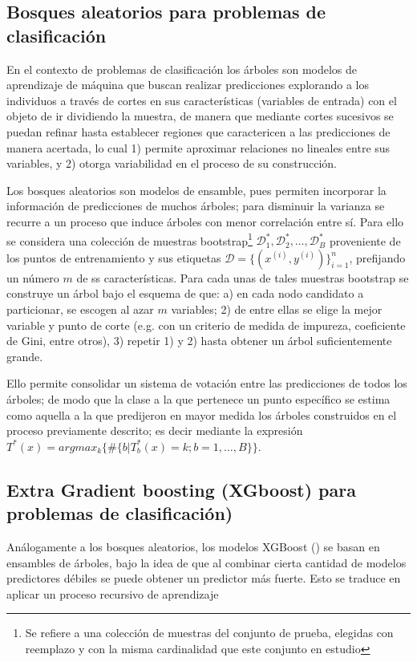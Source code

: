 \documentclass[9pt,twocolumn,twoside]{ilcss}
\begin{document}
\subsection{Bosques aleatorios para problemas de clasificación}

En el contexto de problemas de clasificación los árboles son modelos de aprendizaje de máquina que buscan realizar predicciones explorando a los individuos a través de cortes en sus características (variables de entrada) con el objeto de ir dividiendo la muestra, de manera que mediante cortes sucesivos se puedan refinar hasta establecer regiones que caractericen a las predicciones de manera acertada, lo cual 1) permite aproximar relaciones no lineales entre sus variables, y 2) otorga variabilidad en el proceso de su construcción.

Los bosques aleatorios son modelos de ensamble, pues permiten incorporar la información de predicciones de muchos árboles; para disminuir la varianza se recurre a un proceso que induce árboles con menor correlación entre sí. Para ello se considera una colección de muestras bootstrap\footnote{Se refiere a una colección de muestras del conjunto de prueba, elegidas con reemplazo y con la misma cardinalidad que este conjunto en estudio} ${\mathcal D}_1^*, {\mathcal D}_2^*, \ldots, {\mathcal D}_B^*$ proveniente de los puntos de entrenamiento y sus etiquetas ${\mathcal D} =\{(x^{(i)}, y^{(i)})\}_{i=1}^n$, prefijando un número $m$ de ss características. Para cada unas de tales muestras bootstrap se construye un árbol bajo el esquema de que: a)
en cada nodo candidato a particionar, se escogen al azar $m$ variables; 2) de entre ellas se elige la mejor variable y punto de corte (e.g. con un criterio de medida de impureza, coeficiente de Gini, entre otros), 3) repetir 1) y 2) hasta obtener un árbol suficientemente grande.

Ello permite consolidar un sistema de votación entre las predicciones de todos los árboles; de modo que la clase a la que pertenece un punto específico se estima como aquella a la que predijeron en mayor medida los árboles construidos en el proceso previamente descrito; es decir mediante la expresión $T^*(x) = argmax_k \{ \# \{b |T_b^*(x)=k; b=1,\ldots, B\}\}.$


\subsection{Extra Gradient boosting (XGboost) para problemas de clasificación) }
Análogamente a los bosques aleatorios, los modelos XGBoost (\cite{Chen:2016:XST:2939672.2939785}) se basan en ensambles de árboles, bajo la idea de que al combinar cierta cantidad de modelos predictores débiles se puede obtener un predictor más fuerte. Esto se traduce en aplicar un proceso recursivo de aprendizaje
\end{document}
